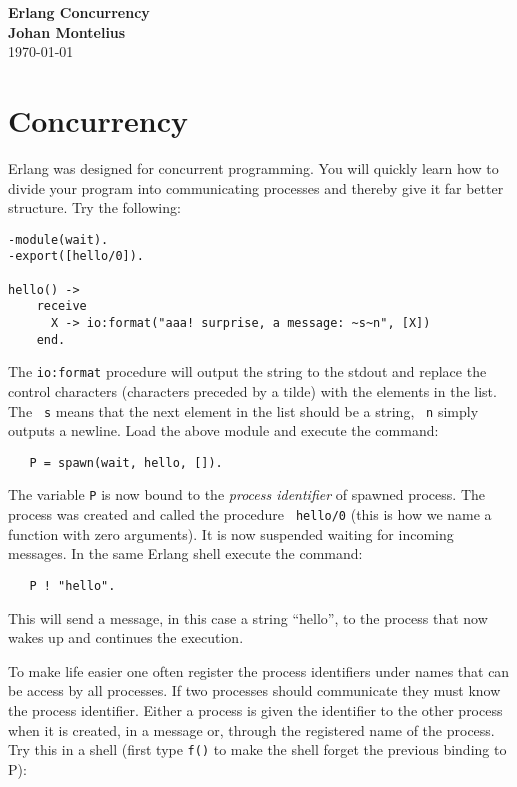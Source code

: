 \documentclass[a4paper,11pt]{article}
\newcommand{\nnsection}[1]{
\section*{#1}
\addcontentsline{toc}{section}{#1}
}
\begin{document}
\begin{center}
\vspace{20pt}
\textbf{\large Erlang Concurrency}\\
\vspace{10pt}
\textbf{Johan Montelius}\\
\vspace{10pt}
\today{}
\end{center}


\nnsection{Concurrency}

Erlang was designed for concurrent programming. You will quickly learn
how to divide your program into communicating processes and thereby
give it far better structure. Try the following:

\begin{verbatim}
-module(wait).
-export([hello/0]).

hello() ->
    receive
      X -> io:format("aaa! surprise, a message: ~s~n", [X])
    end.
\end{verbatim}

\noindent The {\tt io:format} procedure will output the string to the stdout and
replace the control characters (characters preceded by a tilde) with
the elements in the list. The {\tt ~s} means that the next element in
the list should be a string, {\tt ~n} simply outputs a newline. Load
the above module and execute the command:

\begin{verbatim}
   P = spawn(wait, hello, []).
\end{verbatim}

\noindent The variable {\tt P} is now bound to the {\em process identifier} of
spawned process. The process was created and called the procedure {\tt
  hello/0} (this is how we name a function with zero arguments). It is
now suspended waiting for incoming messages. In the same Erlang shell
execute the command:

\begin{verbatim}
   P ! "hello".
\end{verbatim}

\noindent This will send a message, in this case a string ``hello'', to the
process that now wakes up and continues the execution.

To make life easier one often register the process identifiers under
names that can be access by all processes. If two processes should
communicate they must know the process identifier. Either a process is
given the identifier to the other process when it is created, in a
message or, through the registered name of the process. Try this in a
shell (first type {\tt f()} to make the shell forget the previous
binding to P):
\end{document}

